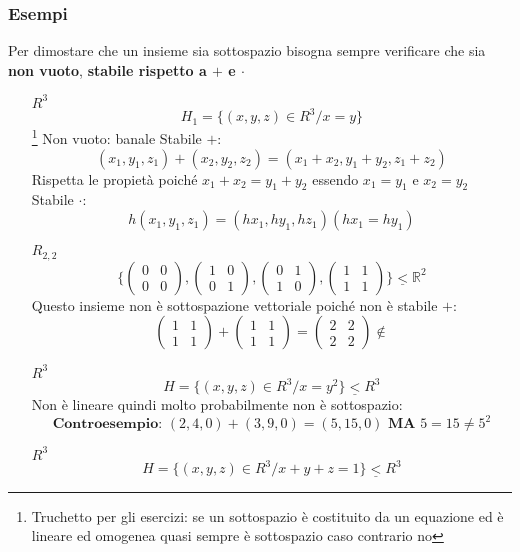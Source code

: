 \subsubsection{Esempi}
Per dimostare che un insieme sia sottospazio bisogna sempre verificare che sia \textbf{non vuoto}, \textbf{stabile rispetto a $+$ e $\cdot$}
\begin{itemize}
\item[$R^3$] $$H_1 = \{(x,y,z) \in R^3 / x=y \}$$ \footnote{Truchetto per gli esercizi: se un sottospazio è costituito da un equazione ed è lineare ed omogenea quasi sempre è sottospazio caso contrario no}
	\subitem Non vuoto: banale
	\subitem Stabile $+$: $$(x_1, y_1, z_1) + (x_2, y_2, z_2) = (x_1+x_2, y_1+y_2, z_1+z_2)$$
	Rispetta le propietà poiché $x_1+x_2 = y_1+y_2$ essendo $x_1=y_1$ e $x_2 = y_2$
	\subitem Stabile $\cdot$: $$ h(x_1, y_1, z_1) = (hx_1, hy_1, hz_1) (hx_1 = hy_1)$$
\item[$R_{2,2}$]  $$ \{ \begin{pmatrix} 0 & 0\\ 0 & 0 \end{pmatrix},  \begin{pmatrix} 1 & 0\\ 0 & 1 \end{pmatrix}, \begin{pmatrix} 0 & 1\\ 1 & 0 \end{pmatrix}, \begin{pmatrix} 1 & 1\\ 1 & 1 \end{pmatrix} \} \underline{<} \mathbb{R}^2 $$ 
Questo insieme non è sottospazione vettoriale poiché non è stabile $+$:
$$ \begin{pmatrix} 1 & 1\\ 1 & 1 \end{pmatrix}  + \begin{pmatrix} 1 & 1\\ 1 & 1 \end{pmatrix}  = \begin{pmatrix} 2 & 2\\ 2 & 2 \end{pmatrix} \not \in $$
\item[$R^3$] $$ H = \{ (x,y,z) \in R^3 / x=y^2 \} \underline{<} R^3 $$ 
Non è lineare quindi molto probabilmente non è sottospazio:
$$ \textbf{Controesempio: }  (2,4,0) + (3,9,0) = (5,15,0) \textbf{ MA } 5 = 15 \neq 5^2 $$
\item[$R^3$] $$ H = \{ (x,y,z) \in R^3 / x+y+z=1 \} \underline{<} R^3 $$ 

\end{itemize}
